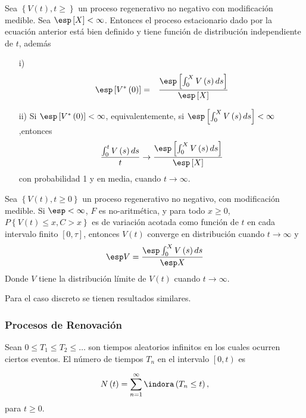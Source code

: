 \begin{Teo}
Sea $\left\{V\left(t\right),t\geq\right\}$ un proceso regenerativo no negativo con modificaci\'on medible. Sea $\esp\left[X\right]<\infty$. Entonces el proceso estacionario dado por la ecuaci\'on anterior est\'a bien definido y tiene funci\'on de distribuci\'on independiente de $t$, adem\'as
\begin{itemize}
\item[i)] \begin{eqnarray*}
\esp\left[V^{*}\left(0\right)\right]&=&\frac{\esp\left[\int_{0}^{X}V\left(s\right)ds\right]}{\esp\left[X\right]}\end{eqnarray*}
\item[ii)] Si $\esp\left[V^{*}\left(0\right)\right]<\infty$, equivalentemente, si $\esp\left[\int_{0}^{X}V\left(s\right)ds\right]<\infty$,entonces
\begin{eqnarray*}
\frac{\int_{0}^{t}V\left(s\right)ds}{t}\rightarrow\frac{\esp\left[\int_{0}^{X}V\left(s\right)ds\right]}{\esp\left[X\right]}
\end{eqnarray*}
con probabilidad 1 y en media, cuando $t\rightarrow\infty$.
\end{itemize}
\end{Teo}

\begin{Coro}
Sea $\left\{V\left(t\right),t\geq0\right\}$ un proceso regenerativo no negativo, con modificaci\'on medible. Si $\esp <\infty$, $F$ es no-aritm\'etica, y para todo $x\geq0$, $P\left\{V\left(t\right)\leq x,C>x\right\}$ es de variaci\'on acotada como funci\'on de $t$ en cada intervalo finito $\left[0,\tau\right]$, entonces $V\left(t\right)$ converge en distribuci\'on  cuando $t\rightarrow\infty$ y $$\esp V=\frac{\esp \int_{0}^{X}V\left(s\right)ds}{\esp X}$$
Donde $V$ tiene la distribuci\'on l\'imite de $V\left(t\right)$ cuando $t\rightarrow\infty$.

\end{Coro}

Para el caso discreto se tienen resultados similares.



\subsubsection{Procesos de Renovaci\'on}

\begin{Def}%
Sean $0\leq T_{1}\leq T_{2}\leq \ldots$ son tiempos aleatorios infinitos en los cuales ocurren ciertos eventos. El n\'umero de tiempos $T_{n}$ en el intervalo $\left[0,t\right)$ es

\begin{eqnarray}
N\left(t\right)=\sum_{n=1}^{\infty}\indora\left(T_{n}\leq t\right),
\end{eqnarray}
para $t\geq0$.
\end{Def}

